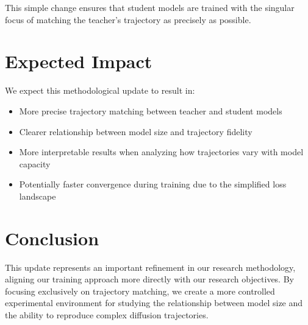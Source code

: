 \documentclass{article}
\begin{document}
This simple change ensures that student models are trained with the singular focus of matching the teacher's trajectory as precisely as possible.

\section{Expected Impact}

We expect this methodological update to result in:

\begin{itemize}
  \item More precise trajectory matching between teacher and student models
  \item Clearer relationship between model size and trajectory fidelity
  \item More interpretable results when analyzing how trajectories vary with model capacity
  \item Potentially faster convergence during training due to the simplified loss landscape
\end{itemize}

\section{Conclusion}

This update represents an important refinement in our research methodology, aligning our training approach more directly with our research objectives. By focusing exclusively on trajectory matching, we create a more controlled experimental environment for studying the relationship between model size and the ability to reproduce complex diffusion trajectories.
\end{document}
